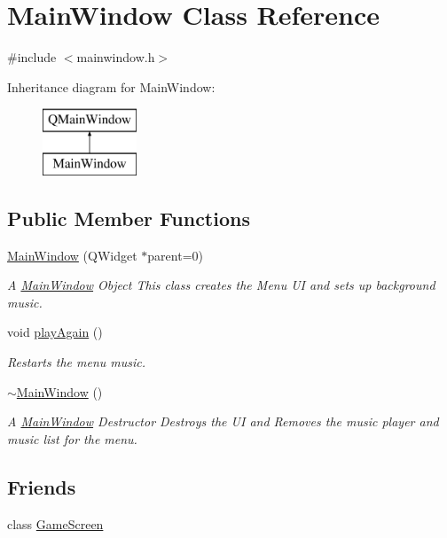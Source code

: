 \hypertarget{class_main_window}{\section{Main\-Window Class Reference}
\label{class_main_window}
}


{\ttfamily \#include $<$mainwindow.\-h$>$}

Inheritance diagram for Main\-Window\-:\begin{figure}[H]
\begin{center}
\leavevmode
\includegraphics[height=2.000000cm]{class_main_window}
\end{center}
\end{figure}
\subsection*{Public Member Functions}
\begin{DoxyCompactItemize}
\item 
\hyperlink{class_main_window_a8b244be8b7b7db1b08de2a2acb9409db}{Main\-Window} (Q\-Widget $\ast$parent=0)
\begin{DoxyCompactList}\small\item\em A \hyperlink{class_main_window}{Main\-Window} Object This class creates the Menu U\-I and sets up background music. \end{DoxyCompactList}\item 
void \hyperlink{class_main_window_ab622d7f3b4082b8221185e216991e602}{play\-Again} ()
\begin{DoxyCompactList}\small\item\em Restarts the menu music. \end{DoxyCompactList}\item 
\hyperlink{class_main_window_ae98d00a93bc118200eeef9f9bba1dba7}{$\sim$\-Main\-Window} ()
\begin{DoxyCompactList}\small\item\em A \hyperlink{class_main_window}{Main\-Window} Destructor Destroys the U\-I and Removes the music player and music list for the menu. \end{DoxyCompactList}\end{DoxyCompactItemize}
\subsection*{Friends}
\begin{DoxyCompactItemize}
\item 
class \hyperlink{class_main_window_a56592566d22f2b39f7d090a5001d3988}{Game\-Screen}
\end{DoxyCompactItemize}


